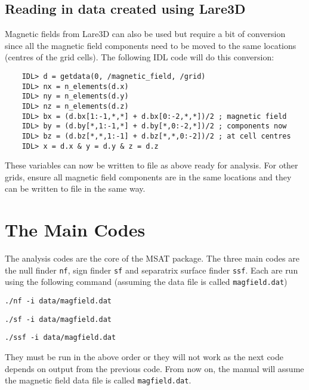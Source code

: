 \documentclass[12pt]{article}
\begin{document}
    \subsection{Reading in data created using Lare3D}

      Magnetic fields from Lare3D can also be used but require a bit of conversion since all the magnetic field components need to be moved to the same locations (centres of the grid cells). The following IDL code will do this conversion:

      \begin{verbatim}
    IDL> d = getdata(0, /magnetic_field, /grid)
    IDL> nx = n_elements(d.x)
    IDL> ny = n_elements(d.y)
    IDL> nz = n_elements(d.z)
    IDL> bx = (d.bx[1:-1,*,*] + d.bx[0:-2,*,*])/2 ; magnetic field
    IDL> by = (d.by[*,1:-1,*] + d.by[*,0:-2,*])/2 ; components now
    IDL> bz = (d.bz[*,*,1:-1] + d.bz[*,*,0:-2])/2 ; at cell centres
    IDL> x = d.x & y = d.y & z = d.z
      \end{verbatim}

      These variables can now be written to file as above ready for analysis. For other grids, ensure all magnetic field components are in the same locations and they can be written to file in the same way.

  \section{The Main Codes}

    The analysis codes are the core of the MSAT package. The three main codes are the null finder \texttt{nf}, sign finder \texttt{sf} and separatrix surface finder \texttt{ssf}. Each are run using the following command (assuming the data file is called \texttt{magfield.dat})

    \texttt{./nf -i data/magfield.dat}

    \texttt{./sf -i data/magfield.dat}
    
    \texttt{./ssf -i data/magfield.dat}

    They must be run in the above order or they will not work as the next code depends on output from the previous code. From now on, the manual will assume the magnetic field data file is called \texttt{magfield.dat}.
\end{document}
